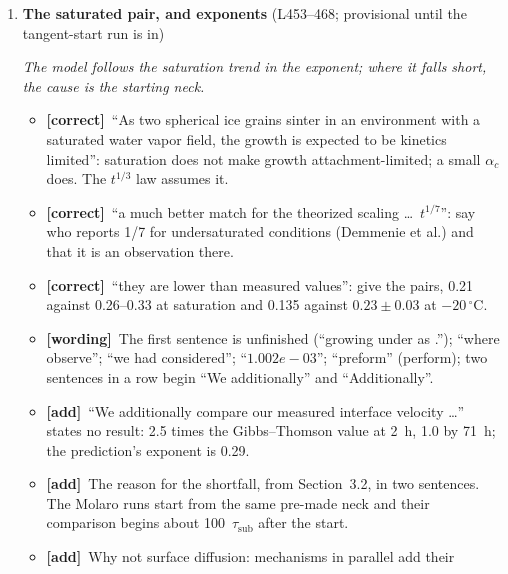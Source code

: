\documentclass[11pt]{article}
\newcommand{\Cite}[1]{\par{\footnotesize\raggedright\textcolor{have}{\textbf{Cite:}} #1\par}}
\newcommand{\Pg}[3]{\item \textbf{#1} {\small(#2)}\par\textit{#3}}
\newcommand{\tC}{\textcolor{miss}{\textbf{[correct]}}\ }
\newcommand{\tG}{\textcolor{stale}{\textbf{[wording]}}\ }
\newcommand{\tA}{\textcolor{have}{\textbf{[add]}}\ }
\begin{document}
\begin{enumerate}
\begin{itemize}
    (iii)~$\alpha_c$ above 0.1 for droplets quenched in liquid nitrogen.
  \item \tA Latent heat is not a candidate: in the run the neck is 0.002~mK
    warmer than the grain surface.
  \item \tA Molaro's own model matches through a vapor term with $\alpha_c =
    1$ and no gas diffusion, and they present its agreement as
    order-of-magnitude.
  \item \tA Why the saturated experiment is the better test: it removes the
    undersaturation.
  \end{itemize}
  \Cite{Molaro et al.\ 2019 \texttt{molaroMicrostructuralEvolutionWater2019}; Swinkels \& Ashby 1981 \texttt{swinkelsSecondReportSintering1981}.}
\Pg{The saturated pair, and exponents}{L453--468; provisional until the tangent-start run is in}{The model follows the saturation trend in the exponent; where it falls short, the cause is the starting neck.}
  \begin{itemize}
  \item \tC ``As two spherical ice grains sinter in an environment with a
    saturated water vapor field, the growth is expected to be kinetics
    limited'': saturation does not make growth attachment-limited; a small
    $\alpha_c$ does. The $t^{1/3}$ law assumes it.
  \item \tC ``a much better match for the theorized scaling \ldots\
    $t^{1/7}$'': say who reports 1/7 for undersaturated conditions
    (Demmenie et al.) and that it is an observation there.
  \item \tC ``they are lower than measured values'': give the pairs, 0.21
    against 0.26--0.33 at saturation and 0.135 against $0.23 \pm 0.03$ at
    $-20\,^{\circ}$C.
  \item \tG The first sentence is unfinished (``growing under as .'');
    ``where observe''; ``we had considered''; ``$1.002e-03$''; ``preform''
    (perform); two sentences in a row begin ``We additionally'' and
    ``Additionally''.
  \item \tA ``We additionally compare our measured interface velocity
    \ldots'' states no result: 2.5 times the Gibbs--Thomson value at 2~h,
    1.0 by 71~h; the prediction's exponent is 0.29.
  \item \tA The reason for the shortfall, from Section~3.2, in two
    sentences. The Molaro runs start from the same pre-made neck and their
    comparison begins about 100~$\tau_{\mathrm{sub}}$ after the start.
  \item \tA Why not surface diffusion: mechanisms in parallel add their

\end{itemize}
\end{enumerate}
\end{document}
